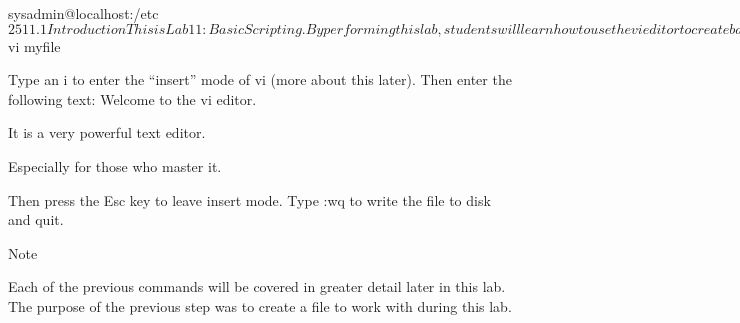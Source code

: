 sysadmin@localhost:/etc$

25







11.1 Introduction
This is Lab 11: Basic Scripting. By performing this lab, students will learn how to use the vi
editor to create basic shell scripts using basic shell commands, variables and control statements.

In this lab, you will perform the following tasks:

● Use the vi editor to create and edit text files.
● Create simple shell scripts.
● Create shell scripts with conditional execution.
● Use loops in the script for repetition.

11.2 Basic Text Editing
Most distributions of Linux have more than one text editor. These may include simple text-only
editors, such as nano, or graphical editors, such as gedit.

In this task, you will explore some of the basic text editing features of the vi editor. All
distributions have some version of vi. The vi editor is a powerful text editor with a bit of a
learning curve, but capable of performing a wide variety of text editing tasks.

The vi editor has two modes: insert and command. In insert mode, you add text to a document.
In command mode, operations such as navigation, searching, saving, and exiting the editor can
be performed .

First install the Vim editor program so that you can use the Vi editor.

11.2.1 Step 1
1



To create a new file, execute the following command:
vi myfile

sysadmin@localhost:~$ vi myfile

Type an i to enter the “insert” mode of vi (more about this later). Then enter the following text:
Welcome to the vi editor.

It is a very powerful text editor.

Especially for those who master it.

Then press the Esc key to leave insert mode. Type :wq to write the file to disk and quit.

Note

Each of the previous commands will be covered in greater detail later in this lab. The purpose of
the previous step was to create a file to work with during this lab.

